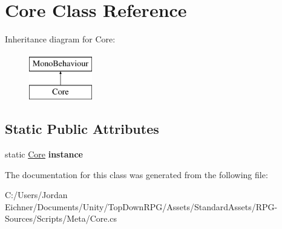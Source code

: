 \hypertarget{class_core}{}\section{Core Class Reference}
\label{class_core}
Inheritance diagram for Core\+:\begin{figure}[H]
\begin{center}
\leavevmode
\includegraphics[height=2.000000cm]{class_core}
\end{center}
\end{figure}
\subsection*{Static Public Attributes}
\begin{DoxyCompactItemize}
\item 
\hypertarget{class_core_add8b471228af83cbf0723baefade84ea}{}static \hyperlink{class_core}{Core} {\bfseries instance}\label{class_core_add8b471228af83cbf0723baefade84ea}

\end{DoxyCompactItemize}


The documentation for this class was generated from the following file\+:\begin{DoxyCompactItemize}
\item 
C\+:/\+Users/\+Jordan Eichner/\+Documents/\+Unity/\+Top\+Down\+R\+P\+G/\+Assets/\+Standard\+Assets/\+R\+P\+G-\/\+Sources/\+Scripts/\+Meta/Core.\+cs\end{DoxyCompactItemize}
